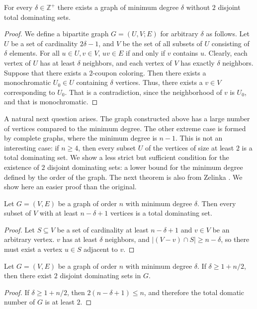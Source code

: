 \begin{thm}
  For every $\delta \in \mathbb{Z}^+$ there exists a graph of minimum degree $\delta$
  without $2$ disjoint total dominating sets.
\end{thm}
\begin{proof}
  We define a bipartite graph $G = (U, V ; E)$ for arbitrary $\delta$ as follows.
  Let $U$ be a set of cardinality $2\delta - 1$, and $V$ be the set of all subsets of
  $U$ consisting of $\delta$ elements. For all $ u \in U, v \in V$, $uv \in E$
  if and only if $v$ contains $u$. Clearly, each vertex of $U$ has at least $\delta$
  neighbors, and each vertex of $V$ has exactly $\delta$ neighbors. Suppose that
  there exists a $2$-coupon coloring. Then there exists a monochromatic $U_0 \in U$
  containing $\delta$ vertices. Thus, there exists a $v \in V$ corresponding to $U_0$.
  That is a contradiction, since the neighborhood of $v$ is $U_0$, and that is monochromatic.
\end{proof}

A natural next question arises. The graph constructed above has a large number
of vertices compared to the minimum degree. The other extreme case is formed by
complete graphs, where the minimum degree is $n - 1$. This is not an interesting case:
if $n \ge 4$, then every subset $U$ of the vertices of size at least $2$ is a total dominating set.
We show a less strict but sufficient condition for the existence of $2$ disjoint dominating sets:
a lower bound for the minimum degree defined by the order of the graph.
The next theorem is also from Zelinka \cite{zelinka}. We show here an easier proof than
the original.

\begin{claim}
  Let $G = (V,E)$ be a graph of order $n$ with minimum degree $\delta$. Then every subset
  of $V$ with at least $n - \delta + 1$ vertices is a total dominating set.
\end{claim}
\begin{proof}
  Let $S \subseteq V$ be a set of cardinality at least $n - \delta + 1$ and $v \in V$ be
  an arbitrary vertex. $v$ has at least $\delta$ neighbors, and $|(V - v) \cap S| \ge
  n - \delta$, so there must exist a vertex $u \in S$ adjacent to $v$.
\end{proof}

\begin{cor}
  Let $G = (V,E)$ be a graph of order $n$ with minimum degree $\delta$. If $\delta \ge 1 + n/2$,
  then there exist $2$ disjoint dominating sets in $G$.
\end{cor}
\begin{proof}
  If $\delta \ge 1 + n/2$, then $2(n - \delta + 1) \le n$, and therefore the total
  domatic number of $G$ is at least $2$.
\end{proof}

